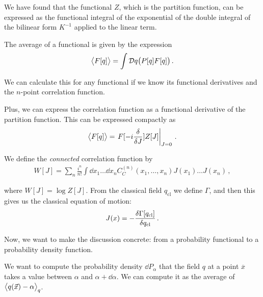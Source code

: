 \documentclass[main.tex]{subfiles}
\begin{document}

We have found that the functional \(Z\), which is the partition function, can be expressed as the functional integral of the exponential of the double integral of the bilinear form \(K^{-1}\) applied to the linear term. 

The average of a functional is given by the expression 
%
\begin{align}
\expval{ F [q]} = \int \mathcal{D}q \qty(P [q] F[q])
\,.
\end{align}

We can calculate this for any functional if we know its functional derivatives and the \(n\)-point correlation function. 

Plus, we can express the correlation function as a functional derivative of the partition function.
This can be expressed compactly as 
%
\begin{align}
\expval{F[q]} = \eval{F[-i \fdv{}{J}] Z[J] }_{J=0}
\,.
\end{align}

We define the \emph{connected} correlation function  by 
%
\begin{align}
W[J] = \sum _{n} \frac{i^{n}}{n!} \int \dd{x_1 } \dots \dd{x_{n}} C^{(n)}_{C} (x_1 , \dots, x_{n}) J(x_1) \dots J(x_{n})
\,,
\end{align}

where \(W[J] = \log Z[J]\). 
From the classical field \(q _{\text{cl}} \) we define \(\Gamma \), and then this gives us the classical equation of motion: 
%
\begin{align}
J(x) = - \fdv{\Gamma [q _{\text{cl}}]}{q _{\text{cl}}}
\,.
\end{align}

Now, we want to make the discussion concrete: from a probability functional to a probability density function. 

We want to compute the probability density \(\dd{P}_{\alpha }\) that the field \(q\) at a point \(\overline{x}\) takes a value between \(\alpha \) and \(\alpha + \dd{\alpha }\). We can compute it as the average of \(\expval{q (\vec{x}) - \alpha }_{q}\).
\end{document}
